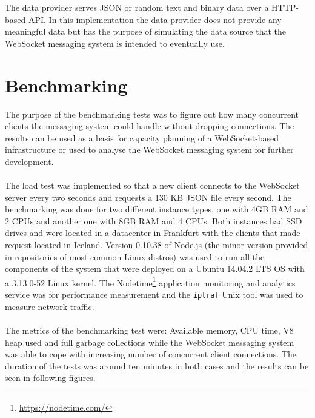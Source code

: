 The data provider serves JSON or random text and binary data over a HTTP-based API. In this implementation the data provider does not provide any meaningful data but has the purpose of simulating the data source that the WebSocket messaging system is intended to eventually use.

\section{Benchmarking}

The purpose of the benchmarking tests was to figure out how many concurrent clients the messaging system could handle without dropping connections. The results can be used as a basis for capacity planning of a WebSocket-based infrastructure or used to analyse the WebSocket messaging system for further development.
\\ \\
The load test was implemented so that a new client connects to the WebSocket server every two seconds and requests a 130 KB JSON file every second. The benchmarking was done for two different instance types, one with 4GB RAM  and 2 CPUs and another one with 8GB RAM and 4 CPUs. Both instances had SSD drives and were located in a datacenter in Frankfurt with the clients that made request located in Iceland. Version 0.10.38 of Node.js (the minor version provided in repositories of most common Linux distros) was used to run all the components of the system that were deployed on a Ubuntu 14.04.2 LTS OS with a 3.13.0-52 Linux kernel. The Nodetime\footnote{\url{https://nodetime.com/}} application monitoring and analytics service was for performance measurement and the \texttt{iptraf} Unix tool was used to measure network traffic.
\\ \\
The metrics of the benchmarking test were: Available memory, CPU time, V8 heap used and full garbage collections while the WebSocket messaging system was able to cope with increasing number of concurrent client connections. The duration of the tests was around ten minutes in both cases and the results can be seen in following figures.
\\

